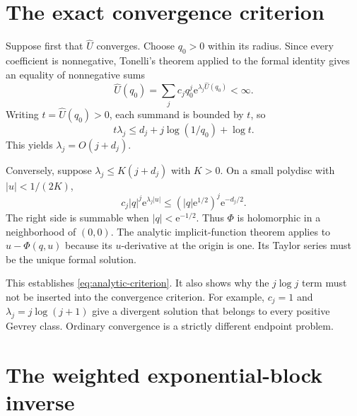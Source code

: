 \documentclass[11pt,a4paper]{article}
\numberwithin{equation}{section}
\theoremstyle{definition}
\theoremstyle{remark}
\theoremstyle{definition}
\newcommand{\U}{\widehat U}
\newcommand{\e}{\mathrm e}
\begin{document}
\section{The exact convergence criterion}
\label{sec:convergence}

Suppose first that $\U$ converges. Choose $q_0>0$ within its radius.
Since every coefficient is nonnegative, Tonelli's theorem applied to the
formal identity gives an equality of nonnegative sums
\[
 \U(q_0)=\sum_j c_jq_0^j\e^{\lambda_j\U(q_0)}<\infty.
\]
Writing $t=\U(q_0)>0$, each summand is bounded by $t$, so
\[
 t\lambda_j\le d_j+j\log(1/q_0)+\log t.
\]
This yields $\lambda_j=O(j+d_j)$.

Conversely, suppose $\lambda_j\le K(j+d_j)$ with $K>0$. On a small
polydisc with $|u|<1/(2K)$,
\begin{equation}
 c_j|q|^j\e^{\lambda_j|u|}
 \le(|q|\e^{1/2})^j\e^{-d_j/2}.
 \label{eq:analytic-majorant}
\end{equation}
The right side is summable when $|q|<\e^{-1/2}$. Thus $\Phi$ is
holomorphic in a neighborhood of $(0,0)$. The analytic implicit-function
theorem applies to $u-\Phi(q,u)$ because its $u$-derivative at the origin
is one. Its Taylor series must be the unique formal solution.

This establishes \eqref{eq:analytic-criterion}. It also shows why the
$j\log j$ term must not be inserted into the convergence criterion.
For example, $c_j=1$ and $\lambda_j=j\log(j+1)$ give a divergent solution
that belongs to every positive Gevrey class. Ordinary convergence is a
strictly different endpoint problem.

\section{The weighted exponential-block inverse}
\label{sec:blocks}
\end{document}
